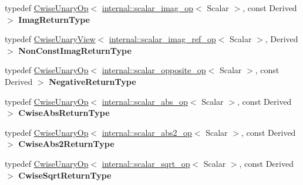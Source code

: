 \begin{DoxyCompactItemize}
\item 
\mbox{\label{class_eigen_1_1_array_base_a25908268fc5e3ead057cca5b3f342edf}} 
typedef \mbox{\hyperlink{class_eigen_1_1_cwise_unary_op}{Cwise\+Unary\+Op}}$<$ \mbox{\hyperlink{struct_eigen_1_1internal_1_1scalar__imag__op}{internal\+::scalar\+\_\+imag\+\_\+op}}$<$ Scalar $>$, const Derived $>$ {\bfseries Imag\+Return\+Type}
\item 
\mbox{\label{class_eigen_1_1_array_base_a12319a8f7c5df701cf18dc09faab92b8}} 
typedef \mbox{\hyperlink{class_eigen_1_1_cwise_unary_view}{Cwise\+Unary\+View}}$<$ \mbox{\hyperlink{struct_eigen_1_1internal_1_1scalar__imag__ref__op}{internal\+::scalar\+\_\+imag\+\_\+ref\+\_\+op}}$<$ Scalar $>$, Derived $>$ {\bfseries Non\+Const\+Imag\+Return\+Type}
\item 
\mbox{\label{class_eigen_1_1_array_base_a94d49c58b972d405e3a81be089072afe}} 
typedef \mbox{\hyperlink{class_eigen_1_1_cwise_unary_op}{Cwise\+Unary\+Op}}$<$ \mbox{\hyperlink{struct_eigen_1_1internal_1_1scalar__opposite__op}{internal\+::scalar\+\_\+opposite\+\_\+op}}$<$ Scalar $>$, const Derived $>$ {\bfseries Negative\+Return\+Type}
\item 
\mbox{\label{class_eigen_1_1_array_base_a17194e0ba6fb3c9e918254fbe7b61dc6}} 
typedef \mbox{\hyperlink{class_eigen_1_1_cwise_unary_op}{Cwise\+Unary\+Op}}$<$ \mbox{\hyperlink{struct_eigen_1_1internal_1_1scalar__abs__op}{internal\+::scalar\+\_\+abs\+\_\+op}}$<$ Scalar $>$, const Derived $>$ {\bfseries Cwise\+Abs\+Return\+Type}
\item 
\mbox{\label{class_eigen_1_1_array_base_a79cf4f066b118bc847a811b3cf9706fa}} 
typedef \mbox{\hyperlink{class_eigen_1_1_cwise_unary_op}{Cwise\+Unary\+Op}}$<$ \mbox{\hyperlink{struct_eigen_1_1internal_1_1scalar__abs2__op}{internal\+::scalar\+\_\+abs2\+\_\+op}}$<$ Scalar $>$, const Derived $>$ {\bfseries Cwise\+Abs2\+Return\+Type}
\item 
\mbox{\label{class_eigen_1_1_array_base_a81369b54956be526ccdda3ad11357ca1}} 
typedef \mbox{\hyperlink{class_eigen_1_1_cwise_unary_op}{Cwise\+Unary\+Op}}$<$ \mbox{\hyperlink{struct_eigen_1_1internal_1_1scalar__sqrt__op}{internal\+::scalar\+\_\+sqrt\+\_\+op}}$<$ Scalar $>$, const Derived $>$ {\bfseries Cwise\+Sqrt\+Return\+Type}

\end{DoxyCompactItemize}

